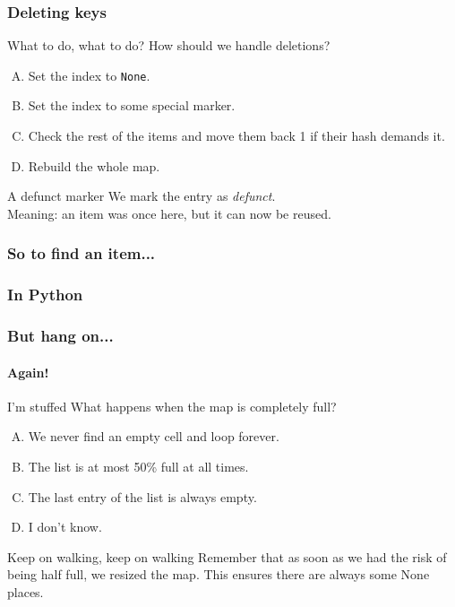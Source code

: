 \begin{frame}
	\frametitle{Deleting keys}
	\begin{questionblock}{What to do, what to do?}
		How should we handle deletions?
		\begin{enumerate}[A.]
			\item Set the index to \texttt{None}.
			\item Set the index to some special marker.
			\item Check the rest of the items and move them back 1 if their hash demands it.
			\item Rebuild the whole map.
		\end{enumerate}
	\end{questionblock}
	\pause
	\begin{answerblock}{A defunct marker}
    We mark the entry as \textit{defunct}.\\
		Meaning: an item was once here, but it can now be reused.		
	\end{answerblock}
\end{frame}

\begin{frame}
	\frametitle{So to find an item...}
	
\end{frame}

\begin{frame}
	\frametitle{In Python}
	
\end{frame}

\begin{frame}
	\frametitle{But hang on...}
	\framesubtitle{Again!}

	\vspace{-5pt}
	
	\vspace{-5pt}
	\begin{questionblock}{I'm stuffed}
		What happens when the map is completely full?\\
		\vspace{-5pt}
		\begin{enumerate}[A.]
			\item We never find an empty cell and loop forever.
			\item The list is at most 50\% full at all times.
			\item The last entry of the list is always empty.
			\item I don't know.
		\end{enumerate}
	\end{questionblock}
	\pause
		\vspace{-5pt}
	\begin{answerblock}{Keep on walking, keep on walking}
		Remember that as soon as we had the risk of being half full, we resized the map. This ensures there are always some
		None places.
	\end{answerblock}
\end{frame}
